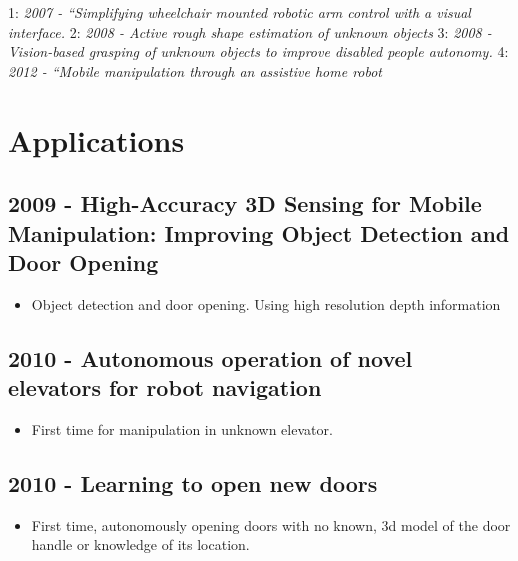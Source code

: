 1: \textit{2007 - “Simplifying wheelchair mounted robotic
arm control with a visual interface.}
2: \textit{2008 - Active rough shape estimation of unknown objects}
3: \textit{2008 - Vision-based grasping of unknown objects to improve disabled people autonomy.}
4: \textit{2012 - “Mobile manipulation through an assistive home robot}

\vspace{3cm}

\section{Applications}
\subsection{2009 - High-Accuracy 3D Sensing for Mobile Manipulation: Improving Object Detection and Door Opening}
\begin{itemize}
\item Object detection and door opening. Using high resolution depth information
\end{itemize}

\subsection{2010 - Autonomous operation of novel elevators for robot navigation}
\begin{itemize}
\item First time for manipulation in unknown elevator.
\end{itemize}

\subsection{2010 - Learning to open new doors}
\begin{itemize}
\item First time, autonomously opening doors with no known, 3d model of the door handle or knowledge of its location.
\end{itemize}